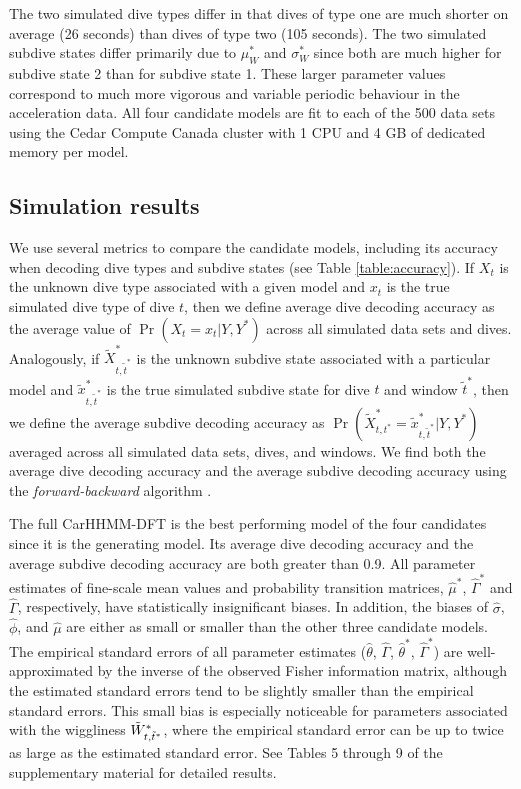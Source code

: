 The two simulated dive types differ in that dives of type one are much shorter on average (26 seconds) than dives of type two (105 seconds). The two simulated subdive states differ primarily due to $\mu_W^*$ and $\sigma_W^*$ since both are much higher for subdive state 2 than for subdive state 1. These larger parameter values correspond to much more vigorous and variable periodic behaviour in the acceleration data. All four candidate models are fit to each of the 500 data sets using the Cedar Compute Canada cluster with 1 CPU and 4 GB of dedicated memory per model.

\subsection{Simulation results}

We use several metrics to compare the candidate models, including its accuracy when decoding dive types and subdive states (see Table \ref{table:accuracy}). If $X_t$ is the unknown dive type associated with a given model and $x_t$ is the true simulated dive type of dive $t$, then we define average dive decoding accuracy as the average value of $\Pr(X_{t} = x_{t}|Y,Y^*)$ across all simulated data sets and dives. Analogously, if $\tilde X^*_{t,\tilde t^*}$ is the unknown subdive state associated with a particular model and $\tilde x^*_{t,\tilde t^*}$ is the true simulated subdive state for dive $t$ and window $\tilde t^*$, then we define the average subdive decoding accuracy as $\Pr(\tilde X^*_{t,t^*} = \tilde x^*_{t,\tilde t^*}|Y,Y^*)$ averaged across all simulated data sets, dives, and windows. We find both the average dive decoding accuracy and the average subdive decoding accuracy using the \textit{forward-backward} algorithm \citep{Zucchini:2016}.

The full CarHHMM-DFT is the best performing model of the four candidates since it is the generating model. Its average dive decoding accuracy and the average subdive decoding accuracy are both greater than 0.9. All parameter estimates of fine-scale mean values and probability transition matrices, $\hat \mu^*$, $\hat \Gamma^*$ and $\hat \Gamma$, respectively, have statistically insignificant biases. In addition, the biases of $\hat \sigma$, $\hat \phi$, and $\hat \mu$ are either as small or smaller than the other three candidate models. The empirical standard errors of all parameter estimates ($\hat \theta$, $\hat \Gamma$, $\hat \theta^*$, $\hat \Gamma^*$) are well-approximated by the inverse of the observed Fisher information matrix, although the estimated standard errors tend to be slightly smaller than the empirical standard errors. This small bias is especially noticeable for parameters associated with the wiggliness $\tilde{W}^*_{t,\tilde t^*}$, where the empirical standard error can be up to twice as large as the estimated standard error. See Tables 5 through 9 of the supplementary material for detailed results.


